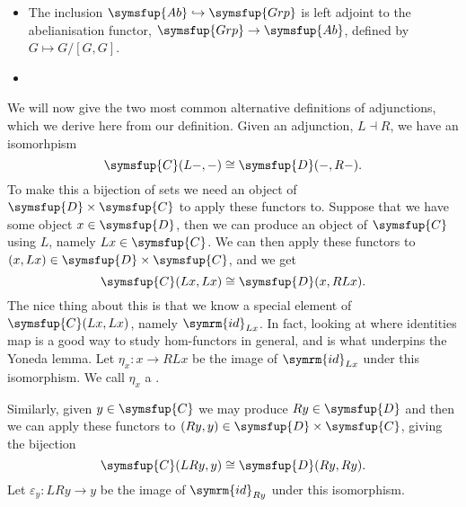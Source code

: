 \documentclass[fleqn]{NotesClass}
\makeatletter
\newcommand{\cat}[1]{\symsfup{#1}}
\newcommand{\c@egory}[1]{\symsfup{#1}}
\newcommand{\Grp}{\c@egory{Grp}}
\newcommand{\Ab}{\c@egory{Ab}}
\newcommand{\id}{\symrm{id}}
\newcommand{\isomorphic}{\cong}
\newcommand{\leftadjointto}{\dashv}
\makeatother
\begin{document}
\begin{exm}{}{}
\begin{itemize}
            \item The inclusion \(\Ab \hookrightarrow \Grp\) is left adjoint to the abelianisation functor, \(\Grp \to \Ab\), defined by \(G \mapsto G/[G, G]\).
            
            \item 
        \end{itemize}
    \end{exm}
    
    We will now give the two most common alternative definitions of adjunctions, which we derive here from our definition.
    Given an adjunction, \(L \leftadjointto R\), we have an isomorhpism
    \begin{equation}
        \cat{C}(L-, -) \isomorphic \cat{D}(-, R-).
    \end{equation}
    To make this a bijection of sets we need an object of \(\cat{D} \times \cat{C}\) to apply these functors to.
    Suppose that we have some object \(x \in \cat{D}\), then we can produce an object of \(\cat{C}\) using \(L\), namely \(Lx \in \cat{C}\).
    We can then apply these functors to \((x, Lx) \in \cat{D} \times \cat{C}\), and we get
    \begin{equation}
        \cat{C}(Lx, Lx) \isomorphic \cat{D}(x, RLx).
    \end{equation}
    The nice thing about this is that we know a special element of \(\cat{C}(Lx, Lx)\), namely \(\id_{Lx}\).
    In fact, looking at where identities map is a good way to study hom-functors in general, and is what underpins the Yoneda lemma.
    Let \(\eta_x \colon x \to RLx\) be the image of \(\id_{Lx}\) under this isomorphism.
    We call \(\eta_x\) a .
    
    Similarly, given \(y \in \cat{C}\) we may produce \(Ry \in \cat{D}\) and then we can apply these functors to \((Ry, y) \in \cat{D} \times \cat{C}\), giving the bijection
    \begin{equation}
        \cat{C}(LRy, y) \isomorphic \cat{D}(Ry, Ry).
    \end{equation}
    Let \(\varepsilon_y \colon LRy \to y\) be the image of \(\id_{Ry}\) under this isomorphism.
    
\end{document}
